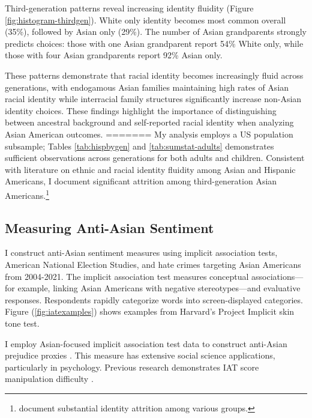 Third-generation patterns reveal increasing identity fluidity (Figure \ref{fig:histogram-thirdgen}). White only identity becomes most common overall (35\%), followed by Asian only (29\%). The number of Asian grandparents strongly predicts choices: those with one Asian grandparent report 54\% White only, while those with four Asian grandparents report 92\% Asian only.

These patterns demonstrate that racial identity becomes increasingly fluid across generations, with endogamous Asian families maintaining high rates of Asian racial identity while interracial family structures significantly increase non-Asian identity choices. These findings highlight the importance of distinguishing between ancestral background and self-reported racial identity when analyzing Asian American outcomes.
=======
My analysis employs a US population subsample; Tables \ref{tab:hispbygen} and \ref{tab:sumstat-adults} demonstrates sufficient observations across generations for both adults and children. Consistent with literature on ethnic and racial identity fluidity among Asian and Hispanic Americans, I document significant attrition among third-generation Asian Americans.\footnote{\textcite{duncanIdentifyingLaterGenerationDescendants2018,duncanSocioeconomicIntegrationImmigrant2018, antmanEthnicAttritionObserved2016,antmanEthnicAttritionAssimilation2020} document substantial identity attrition among various groups.}

\subsection{Measuring Anti-Asian Sentiment}\label{sub:lw-bias}

I construct anti-Asian sentiment measures using implicit association tests, American National Election Studies, and hate crimes targeting Asian Americans from 2004-2021. The implicit association test measures conceptual associations—for example, linking Asian Americans with negative stereotypes—and evaluative responses. Respondents rapidly categorize words into screen-displayed categories. Figure (\ref{fig:iatexamples}) shows examples from Harvard's Project Implicit skin tone test.

I employ Asian-focused implicit association test data to construct anti-Asian prejudice proxies \autocite{greenwaldMeasuringIndividualDifferences1998}. This measure has extensive social science applications, particularly in psychology. Previous research demonstrates IAT score manipulation difficulty \autocite{egloffPredictiveValidityImplicit2002}.

